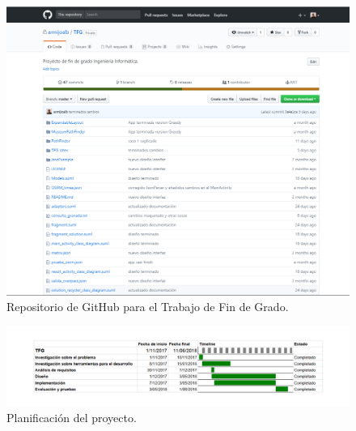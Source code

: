 \begin{figure}[H]
	\centering
	\includegraphics[scale=0.5]{imagenes/github_example}
	\caption{Repositorio de GitHub para el Trabajo de Fin de Grado.}
	\label{fig:github}
\end{figure}

\newpage
\begin{figure}[H]
	\centering
	\includegraphics[scale=0.55,angle=90]{imagenes/Gantt.png}
	\caption{Planificación del proyecto.}
	\label{fig:gantt}
\end{figure}
